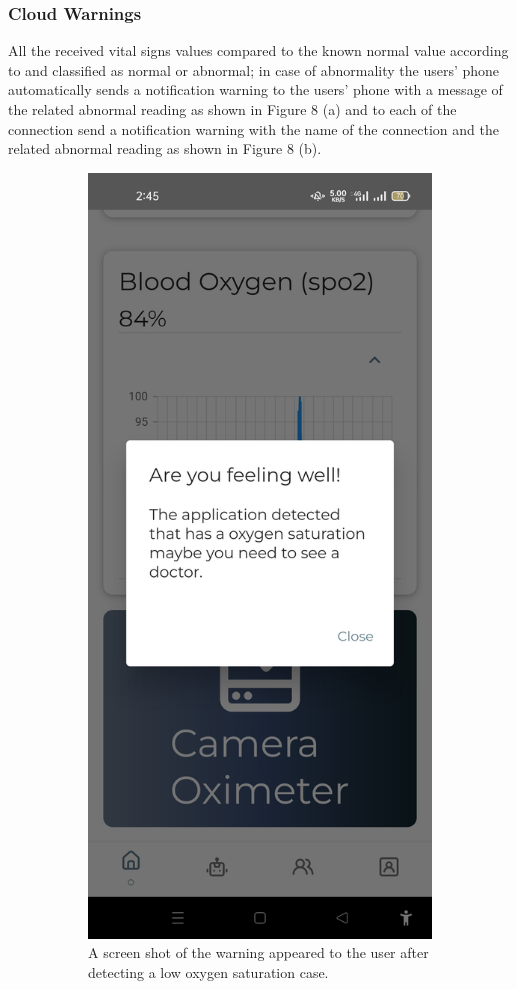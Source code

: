 \documentclass{bmcart}
\begin{document}
\subsubsection*{Cloud Warnings}
All the received vital signs values compared to the known normal value according
to \cite{pulse} and classified as normal or abnormal; in case of abnormality the
users' phone automatically sends a notification warning to the users' phone with
a message of the related abnormal reading as shown in Figure 8 (a) and to each
of the connection send a notification warning with the name of the connection
and the related abnormal reading as shown in Figure 8 (b).
\begin{figure}[h!]
  \begin{subfigure}{0.45\textwidth}
  \includegraphics[width=.5\linewidth]{png_images/user_warning.png}
  \caption{
      A screen shot of the warning appeared to the user after detecting a low
      oxygen saturation case.}
    \end{subfigure}
    \begin{subfigure}{0.45\textwidth}

\end{subfigure}
\end{figure}
\end{document}
